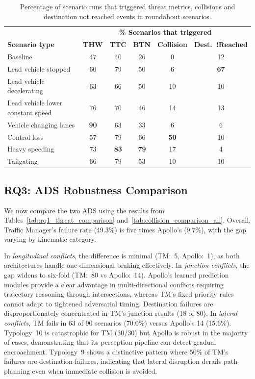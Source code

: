 \begin{table}[h]
\centering
\caption{Percentage of scenario runs that triggered threat metrics, collisions and destination not reached events in roundabout scenarios.}
\label{tab:rdb_events}
\begin{tabular}{lccccc}
\toprule
& \multicolumn{5}{c}{\textbf{\% Scenarios that triggered}} \\
\textbf{Scenario type} & \textbf{THW} & \textbf{TTC} & \textbf{BTN} & \textbf{Collision} & \textbf{Dest.\ !Reached} \\
\midrule
Baseline                              & 47 & 40 & 26 &  0 & 12 \\
\midrule
\rowcolor{blue!5}
  Lead vehicle stopped             & 60 & 79 & 50 &  6 & \textbf{67} \\
\rowcolor{blue!5}
  Lead vehicle decelerating        & 63 & 66 & 50 & 10 & 10 \\
\rowcolor{blue!5}
  Lead vehicle lower constant speed& 76 & 70 & 46 & 14 & 13 \\
\rowcolor{orange!5}
  Vehicle changing lanes           & \textbf{90} & 63 & 33 &  6 &  6 \\
  Control loss                     & 57 & 79 & 66 & \textbf{50} & 10 \\
  Heavy speeding                   & 73 & \textbf{83} & \textbf{79} & 17 &  4 \\
  Tailgating                       & 66 & 79 & 53 & 10 & 10 \\
\bottomrule
\end{tabular}
\end{table}


\subsection{RQ3: ADS Robustness Comparison}

We now compare the two ADS using the results from Tables~\ref{tab:rq1_threat_comparison} and~\ref{tab:collision_comparison_all}. Overall, Traffic Manager's failure rate (49.3\%) is five times Apollo's (9.7\%), with the gap varying by kinematic category.

In \textit{longitudinal conflicts}, the difference is minimal (TM:~5, Apollo:~1), as both architectures handle one-dimensional braking effectively. In \textit{junction conflicts}, the gap widens to six-fold (TM:~80 vs Apollo:~14). Apollo's learned prediction modules provide a clear advantage in multi-directional conflicts requiring trajectory reasoning through intersections, whereas TM's fixed priority rules cannot adapt to tightened adversarial timing. Destination failures are disproportionately concentrated in TM's junction results (18 of 80). In \textit{lateral conflicts}, TM fails in 63 of 90 scenarios (70.0\%) versus Apollo's 14 (15.6\%). Typology~10 is catastrophic for TM (30/30) but Apollo is robust in the majority of cases, demonstrating that its perception pipeline can detect gradual encroachment. Typology~9 shows a distinctive pattern where 50\% of TM's failures are destination failures, indicating that lateral disruption derails path-planning even when immediate collision is avoided.


